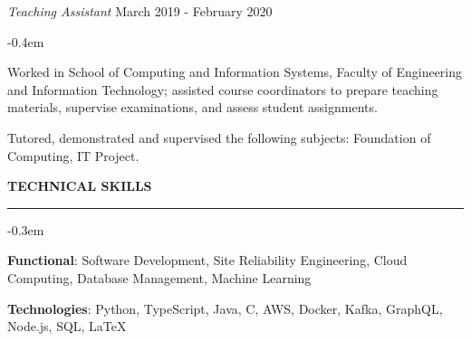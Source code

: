\documentclass{cv}
\begin{document}
\begin{list}{}{\setlength{\leftmargin}{0em}}
    {\textit{Teaching Assistant}} \hfill {March 2019 - February 2020}%
    \begin{list}{\raisebox{0.2em}{\tiny$\bullet$} \hspace{0em}}{\setlength{\leftmargin}{2.0em}}
        \itemsep -0.4em \vspace{-0.4em}
        \item Worked in School of Computing and Information Systems, Faculty of Engineering and Information Technology; assisted course coordinators to prepare teaching materials, supervise examinations, and assess student assignments.
        \item Tutored, demonstrated and supervised the following subjects: Foundation of Computing, IT Project.
    \end{list}
\end{list}


\sectionskip


\textbf{\uppercase{Technical Skills}}
\sectionlineskip
\hrule height 0.1em
\begin{list}{}{\setlength{\leftmargin}{0em}}
\itemsep -0.3em
\item
    \textbf{Functional}: Software Development, Site Reliability Engineering, Cloud Computing, Database Management, Machine Learning
\item
    \textbf{Technologies}: Python, TypeScript, Java, C, AWS, Docker, Kafka, GraphQL, Node.js, SQL, \LaTeX
\end{list}


\sectionskip

\end{document}
